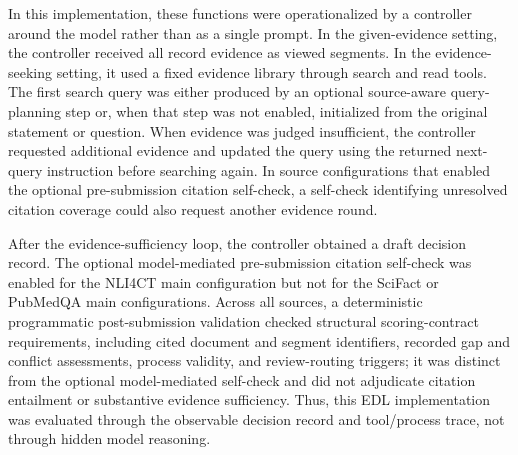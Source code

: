 \documentclass[11pt,a4paper]{article}
\begin{document}
In this implementation, these functions were operationalized by a controller around the model rather than as a single prompt. In the given-evidence setting, the controller received all record evidence as viewed segments. In the evidence-seeking setting, it used a fixed evidence library through search and read tools. The first search query was either produced by an optional source-aware query-planning step or, when that step was not enabled, initialized from the original statement or question. When evidence was judged insufficient, the controller requested additional evidence and updated the query using the returned next-query instruction before searching again. In source configurations that enabled the optional pre-submission citation self-check, a self-check identifying unresolved citation coverage could also request another evidence round.

After the evidence-sufficiency loop, the controller obtained a draft decision record. The optional model-mediated pre-submission citation self-check was enabled for the NLI4CT main configuration but not for the SciFact or PubMedQA main configurations. Across all sources, a deterministic programmatic post-submission validation checked structural scoring-contract requirements, including cited document and segment identifiers, recorded gap and conflict assessments, process validity, and review-routing triggers; it was distinct from the optional model-mediated self-check and did not adjudicate citation entailment or substantive evidence sufficiency. Thus, this EDL implementation was evaluated through the observable decision record and tool/process trace, not through hidden model reasoning.
\end{document}
